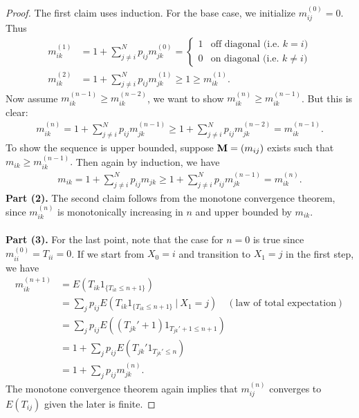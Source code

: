 \documentclass[./some_latex_template.tex]{subfiles}
\begin{document}
\begin{proof}
The first claim uses induction. For the base case, we initialize $m_{ij}^{(0)} = 0$. Thus
\begin{align*}
	m_{ik}^{(1)} 
	&= 1 + \sum_{j\neq i}^{N} p_{ij}m_{jk}^{(0)} = 
	\begin{cases}
		1 & \text{off diagonal (i.e. } k = i)\\
		0 & \text{on diagonal (i.e. } k \neq i)
	\end{cases}\\
	m_{ik}^{(2)} 
	&= 1 + \sum_{j\neq i}^{N} p_{ij} m_{jk}^{(1)} \ge 1 \ge m_{ik}^{(1)}.
\end{align*} 
Now assume $m_{ik}^{(n-1)} \ge m_{ik}^{(n-2)}$, we want to show $m_{ik}^{(n)} \ge m_{ik}^{(n-1)}$. But this is clear: 
\begin{align*}
	m_{ik}^{(n)} = 1 + \sum_{j\neq i}^{N} p_{ij} m_{jk}^{(n - 1)} \geq  1 + \sum_{j\neq i}^{N} p_{ij} m_{jk}^{(n-2)} = 	m_{ik}^{(n - 1)}.
\end{align*}
To show the sequence is upper bounded, suppose $\mathbf{M} = (m_{ij})$ exists such that $m_{ik} \ge m_{ik}^{(n - 1)}.$ Then again by induction, we have
\begin{align*}
	m_{ik} = 1 + \sum_{j \neq i}^{N}p_{ij}m_{jk} \ge 1 + \sum_{j\neq i}^N p_{ij} m_{jk}^{(n-1)} = m_{ik}^{(n)}.
\end{align*}
\textbf{Part (2).} The second claim follows from the monotone convergence theorem, since $m_{ik}^{(n)}$ is monotonically increasing in $n$ and upper bounded by $m_{ik}$. \\
\\
\textbf{Part (3).} For the last point, note that the case for $n = 0$ is true since $m_{ii}^{(0)} = T_{ii} = 0$. If we start from $X_0 = i$ and transition to $X_1 = j$ in the first step, we have
\begin{align*}
	m_{ik}^{(n + 1)} 
	&= E\left( T_{ik} 1_{\{T_{ik} \le n + 1\}} \right)\\
	&= \sum_{j} p_{ij} E\left( T_{ik} 1_{\{T_{ik} \le n + 1\}} \ \big| \ X_1 = j\right) \quad (\text{law of total expectation})\\
	&= \sum_{j} p_{ij} E\left( (T_{jk}' + 1) 1_{T_{jk}' + 1 \le n + 1} \right)\\
	&= 1 + \sum_{j} p_{ij} E\left( T_{jk}' 1_{T_{jk}' \le n} \right)\\
	&= 1 + \sum_{j}p_{ij}m_{jk}^{(n)}.
\end{align*} 
The monotone convergence theorem again implies that $m_{ij}^{(n)}$ converges to $E(T_{ij})$ given the later is finite. 
\end{proof}
\end{document}

